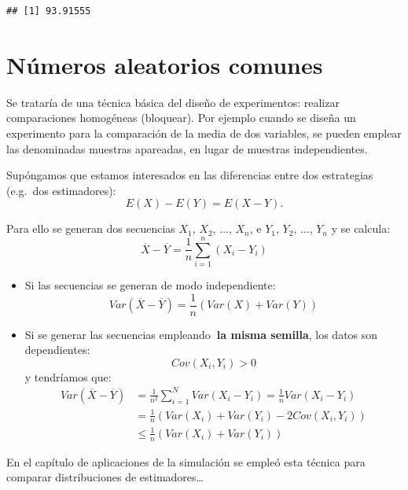 \documentclass[
]{book}
\theoremstyle{break}
\theoremstyle{definition}
\theoremstyle{definition}
\theoremstyle{definition}
\theoremstyle{remark}
\begin{document}
\begin{verbatim}
## [1] 93.91555
\end{verbatim}

\hypertarget{nuxfameros-aleatorios-comunes}{%
\section{Números aleatorios comunes}\label{nuxfameros-aleatorios-comunes}}

Se trataría de una técnica básica del diseño de experimentos:
realizar comparaciones homogéneas (bloquear).
Por ejemplo cuando se diseña un experimento para la comparación
de la media de dos variables, se pueden emplear las denominadas
muestras apareadas, en lugar de muestras independientes.

Supóngamos que estamos interesados en las diferencias entre dos
estrategias (e.g.~dos estimadores):
\[E\left(  X\right)  -E\left(  Y\right)  =E\left(  X-Y\right).\]

Para ello se generan dos secuencias \(X_{1}\), \(X_{2}\), \(\ldots\),
\(X_{n}\), e \(Y_{1}\), \(Y_{2}\), \(\ldots\), \(Y_{n}\) y se calcula:
\[\overline{X}-\overline{Y}=\frac{1}{n}\sum_{i=1}^{n}\left(  X_{i}-Y_{i}\right)\]

\begin{itemize}
\item
  Si las secuencias se generan de modo independiente:
  \[Var\left( \overline{X} - \overline{Y} \right) 
  = \frac{1}{n} \left( Var\left( X \right) + Var\left( Y \right) \right)\]
\item
  Si se generar las secuencias empleando\textbf{~la misma semilla},
  los datos son dependientes:
  \[Cov\left( X_{i}, Y_{i} \right) > 0\]
  y tendríamos que:
  \[\begin{aligned}
  Var\left( \overline{X}-\overline{Y}\right)  &
  = \frac{1}{n^{2}}\sum_{i=1}^{N}Var\left( X_{i}-Y_{i}\right) 
  = \frac{1}{n}Var\left( X_{i}-Y_{i}\right) \\
  & = \frac{1}{n}\left( Var\left( X_{i} \right) + Var\left( Y_{i} \right)
  - 2Cov\left( X_{i},Y_{i} \right) \right) \\
  & \leq \frac{1}{n}\left( Var\left( X_{i} \right) 
  + Var\left( Y_{i}\right) \right)
  \end{aligned}\]
\end{itemize}

En el capítulo de aplicaciones de la simulación se empleó esta técnica para comparar distribuciones de estimadores\ldots{}
\end{document}
